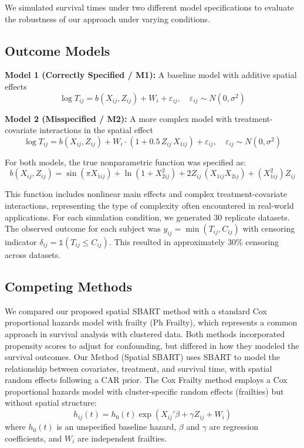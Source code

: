 \documentclass[useAMS,referee]{biom}
\begin{document}
We simulated survival times under two different model specifications to evaluate the robustness of our approach under varying conditions.

\subsection{Outcome Models}

\textbf{Model 1 (Correctly Specified / M1):} A baseline model with additive spatial effects
\begin{equation}
\log T_{ij} = b(X_{ij}, Z_{ij}) + W_i + \varepsilon_{ij}, \quad \varepsilon_{ij} \sim N(0, \sigma^2)
\end{equation}

\textbf{Model 2 (Misspecified / M2):} A more complex model with treatment-covariate interactions in the spatial effect
\begin{equation}
\log T_{ij} = b(X_{ij}, Z_{ij}) + W_i \cdot (1 + 0.5 \, Z_{ij} \, X_{1ij}) + \varepsilon_{ij}, \quad \varepsilon_{ij} \sim N(0, \sigma^2)
\end{equation}

For both models, the true nonparametric function was specified as:
\begin{equation}
b(X_{ij}, Z_{ij}) = \sin(\pi X_{1ij}) + \ln(1 + X_{2ij}^2) + 2Z_{ij} \, (X_{1ij}X_{2ij}) + (X_{1ij}^2)Z_{ij}
\end{equation}

This function includes nonlinear main effects and complex treatment-covariate interactions, representing the type of complexity often encountered in real-world applications. For each simulation condition, we generated 30 replicate datasets. The observed outcome for each subject was $y_{ij} = \min(T_{ij}, C_{ij})$ with censoring indicator $\delta_{ij} = \mathds{1}(T_{ij} \leq C_{ij})$. This resulted in approximately 30\% censoring across datasets.

\subsection{Competing Methods}

We compared our proposed spatial SBART method with a standard Cox proportional hazards model with frailty (Ph Frailty), which represents a common approach in survival analysis with clustered data. Both methods incorporated propensity scores to adjust for confounding, but differed in how they modeled the survival outcomes. Our Method (Spatial SBART) uses SBART to model the relationship between covariates, treatment, and survival time, with spatial random effects following a CAR prior. The Cox Frailty method employs a Cox proportional hazards model with cluster-specific random effects (frailties) but without spatial structure:
\begin{equation}
h_{ij}(t) = h_0(t) \exp(X_{ij}'\beta + \gamma Z_{ij} + W_i)
\end{equation}
where $h_0(t)$ is an unspecified baseline hazard, $\beta$ and $\gamma$ are regression coefficients, and $W_i$ are independent frailties.
\end{document}
